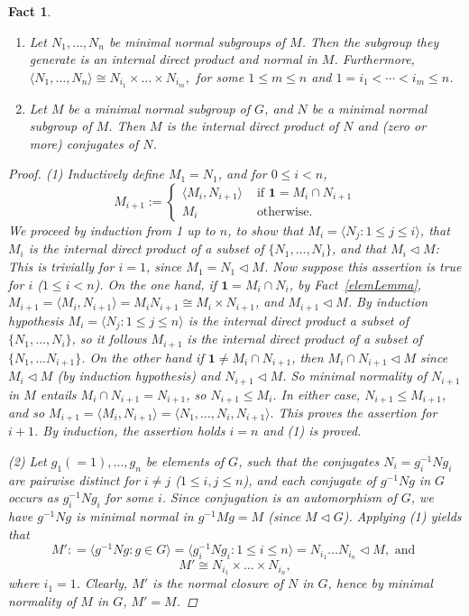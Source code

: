\documentclass[a4paper,11pt]{amsart}
\newtheorem{fact}[theorem]{Fact}
\theoremstyle{definition}
\newcommand{\1}{{\mathbf 1}}
\begin{document}
 \begin{fact}\label{ProdMinNorm}
\begin{enumerate}
\item
Let  $N_1, \ldots, N_n$ be minimal normal subgroups of $M$. Then the subgroup they generate is an internal direct product and normal in $M$.  Furthermore,  
$\langle N_1, \ldots, N_n \rangle \cong N_{i_1} \times \ldots \times N_{i_m}, $
for some $1 \leq m \leq n$ and $1 = i_1 < \cdots < i_m \leq n$.
    \item Let  $M$ be a minimal normal subgroup of $G$, and $N$ be a minimal normal subgroup of $M$. 
    Then $M$ is the internal direct product of $N$ and (zero or more) conjugates of $N$. 
\end{enumerate}
\begin{proof}
 (1)  Inductively define $M_1=N_1$, and for $0 \leq i<n$, 
 $$M_{i+1}:= \begin{cases}
  \langle M_i, N_{i+1} \rangle  &  \mbox{ if } \1 = M_i \cap N_{i+1} \\
      M_i     & \mbox{ otherwise.}
 \end{cases}$$
 We proceed by induction from 1 up to $n$, to show that $M_i = \langle N_j : 1 \leq j \leq i\rangle$, that  $M_i$ is the internal direct product of a subset of $\{N_1, \ldots , N_i\}$,  and that $M_i \lhd M$:   This is trivially for $i=1$, since $M_1=N_1 \lhd M$.  Now suppose this assertion is true for $i$ ($1 \leq i<n$).  
 On the one hand, 
if $\1 = M_i \cap N_i$,  by Fact~\ref{elemLemma}, $M_{i+1}=\langle M_i, N_{i+1} \rangle= M_i N_{i+1} \cong M_i \times N_{i+1}$, and $M_{i+1} \lhd M$. By induction hypothesis $M_i=\langle N_j : 1 \leq j \leq n \rangle$ is the internal direct product a subset of   $\{N_1, \ldots , N_i\}$, so it follows $M_{i+1}$ is the internal  direct product of a subset of 
$\{N_1, \ldots N_{i+1}\}$.    On the other hand if $\1 \neq M_i \cap N_{i+1}$, then  $ M_i \cap N_{i+1} \lhd M$ since $M_i \lhd M$ (by induction hypothesis) and $N_{i+1}\lhd M$. So minimal normality of $N_{i+1}$ in $M$ entails $M_i \cap N_{i+1} =N_{i+1}$, so $N_{i+1} \leq M_i$.  In either case, $N_{i+1} \leq M_{i+1}$, and so $M_{i+1}=\langle M_i, N_{i+1} \rangle = \langle N_1, \ldots, N_i, N_{i+1}\rangle.$ This proves the assertion for $i+1$.  By induction, the assertion holds $i=n$ and (1) is proved.
 
 (2) Let $g_1(=1), \ldots, g_n$ be elements of $G$, such that the conjugates $N_i=g_i^{-1} N g_i$ are pairwise distinct for $i\neq j$ ($1\leq i, j \leq n$), and each conjugate of $g^{-1}Ng$ in $G$ occurs as  $g_i^{-1}Ng_i$ for some $i$.
  Since  conjugation is an automorphism of $G$, 
we have $g^{-1} N g $ is minimal normal in $g^{-1} M g=M$ (since $M \lhd G$).
Applying (1) yields that
$$M': =\langle g^{-1} N g : g\in G \rangle = \langle g_i^{-1} N g_i : 1 \leq i \leq n \rangle = 
 N_{i_1} \ldots N_{i_n} \lhd M, \mbox{ and } $$
 $$M'\cong  N_{i_1} \times  \ldots \times N_{i_n},$$ where $i_1=1$.
Clearly, $M'$ is the normal closure of $N$ in $G$, hence by minimal normality of $M$ in $G$, $M'=M$.  
\end{proof}
 \end{fact}
 
\end{document}
